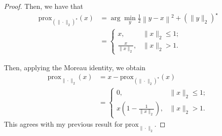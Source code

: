 \documentclass[11pt]{amsart}
\begin{document}
\begin{enumerate}
\begin{enumerate}
\begin{proof}
  Then, we have that
  \begin{align*}
    \mbox{prox}_{\left(\|\cdot\|_2\right)^\star} (x)
    &= \arg\min_y\frac{1}{2}\left\|y - x\right\|^2 + \left(\|y\|_2\right)^\star \\
    &= \begin{cases}
      x, &\|x\|_2 \leq 1; \\
      \frac{x}{\|x\|_2}, &\|x\|_2 > 1.
    \end{cases}
  \end{align*}
  
  Then, applying the Moreau identity, we obtain
  \begin{align*}
    \mbox{prox}_{\|\cdot\|_2} (x)
    &= x - \mbox{prox}_{\left(\|\cdot\|_2\right)^\star} (x) \\
    &= \begin{cases}
      0, &\|x\|_2 \leq 1; \\
      x\left(1 - \frac{1}{\|x\|_2}\right), &\|x\|_2 > 1.
    \end{cases}
  \end{align*}
  This agrees with my previous result for $\mbox{prox}_{\|\cdot\|_2}$.
  
\end{proof}
\end{enumerate}





%
%
%
%
%
%
%


\end{enumerate}
\end{document}
